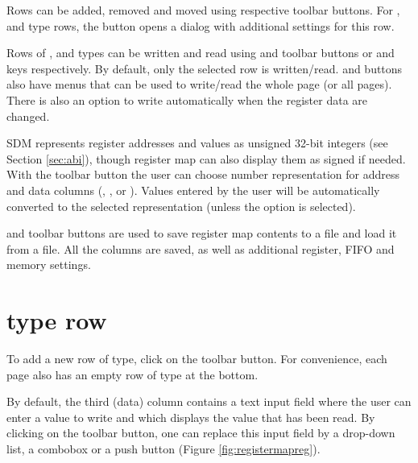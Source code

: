\documentclass[a4paper,12pt,twoside,extrafontsizes]{memoir}
\begin{document}
Rows can be added, removed and moved using respective toolbar buttons. For ,  and  type rows, the  button opens a dialog with additional settings for this row.

Rows of ,  and  types can be written and read using  and  toolbar buttons or  and  keys respectively. By default, only the selected row is written/read.  and  buttons also have menus that can be used to write/read the whole page (or all pages). There is also an option to write automatically when the register data are changed.

SDM represents register addresses and values as unsigned 32-bit integers (see Section \ref{sec:abi}), though register map can also display them as signed if needed. With the  toolbar button the user can choose number representation for address and data columns (, ,  or ). Values entered by the user will be automatically converted to the selected representation (unless the  option is selected).

 and  toolbar buttons are used to save register map contents to a file and load it from a file. All the columns are saved, as well as additional register, FIFO and memory settings.

\section[Register type row]{ type row}

To add a new row of  type, click on the  toolbar button. For convenience, each page also has an empty row of  type at the bottom.

By default, the third (data) column contains a text input field where the user can enter a value to write and which displays the value that has been read. By clicking on the  toolbar button, one can replace this input field by a drop-down list, a combobox or a push button (Figure \ref{fig:registermapreg}).
\end{document}
